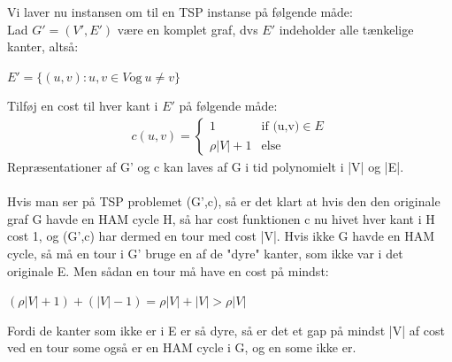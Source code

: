\documentclass{article}
\begin{document}
Vi laver nu instansen om til en TSP instanse på følgende måde:\\
Lad $G' = (V',E')$ være en komplet graf, dvs $E'$ indeholder alle tænkelige kanter, altså:
\begin{center}
	$E' = \{(u,v):u,v\in V \text{og} \ u \neq v\}$
\end{center} 
Tilføj en cost til hver kant i $E'$ på følgende måde:
\begin{gather*}  
c(u,v)= 
\begin{cases}
  1 & \text{if (u,v)} \in E\\    
  \rho |V| +1 & \text{else}
\end{cases}
\end{gather*}
Repræsentationer af G' og c kan laves af G i tid polynomielt i |V| og |E|.\\\\

Hvis man ser på TSP problemet (G',c), så er det klart at hvis den den originale graf G havde en HAM cycle H, så har cost funktionen c nu hivet hver kant i H cost 1, og (G',c) har dermed en tour med cost |V|. Hvis ikke G havde en HAM cycle, så må en tour i G' bruge en af de "dyre" kanter, som ikke var i det originale E. Men sådan en tour må have en cost på mindst:
\begin{center}
	$(\rho |V| +1) + (|V|-1) = \rho |V| + |V|  > \rho |V|$
\end{center}
Fordi de kanter som ikke er i E er så dyre, så er det et gap på mindst |V| af cost ved en tour some også er en HAM cycle i G, og en some ikke er.\\
\end{document}
